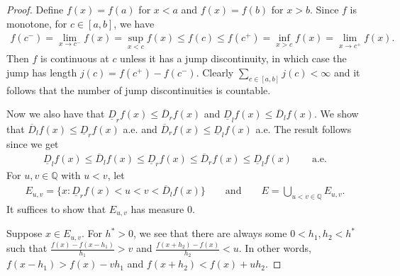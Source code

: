 \documentclass[11pt]{amsart}
\theoremstyle{definition}
\numberwithin{equation}{section}
\begin{document}
\begin{proof}
    Define $f(x)=f(a)$ for $x<a$ and $f(x)=f(b)$ for $x>b$. Since $f$ is monotone, for $c\in [a,b]$, we have 
    \begin{align*}
        f(c^-)=\lim_{x\to c^-}f(x)=\sup_{x<c}f(x)\le f(c)\le f(c^+)=\inf_{x>c}f(x)=\lim_{x\to c^+}f(x).
    \end{align*}
    Then $f$ is continuous at $c$ unless it has a jump discontinuity, in which case the jump has length $j(c)=f(c^+)-f(c^-)$. Clearly $\sum_{c\in[a,b]}j(c)<\infty$ and it follows that the number of jump discontinuities is countable.

    Now we also have that $\underline D_rf(x)\le \overline D_rf(x)$ and $\underline D_lf(x)\le \overline D_lf(x)$. We show that $\overline D_lf(x)\le \underline D_rf(x)$ a.e. and $\overline D_rf(x)\le \underline D_lf(x)$ a.e. The result follows since we get 
    \begin{align*}
        \underline D_lf(x)\le \overline D_lf(x)\le \underline D_rf(x)\le \overline D_rf(x)\le \underline D_lf(x)\qquad \mathrm{a.e.}
    \end{align*}
    For $u,v\in \mathbb Q$ with $u<v$, let 
    \begin{align*}
        E_{u,v}=\{x:\underline D_rf(x)<u<v<\overline D_lf(x)\}\qquad\mathrm{and}\qquad E=\bigcup_{u<v\in\mathbb Q}E_{u,v}.
    \end{align*}
    It suffices to show that $E_{u,v}$ has measure 0.

    Suppose $x\in E_{u,v}$. For $h^*>0$, we see that there are always some $0<h_1,h_2<h^*$ such that $\frac{f(x)-f(x-h_1)}{h_1}> v$ and $\frac{f(x+h_2)-f(x)}{h_2}<u$. In other words, $f(x-h_1)>f(x)-vh_1$ and $f(x+h_2)<f(x)+uh_2$.


\end{proof}
\end{document}
